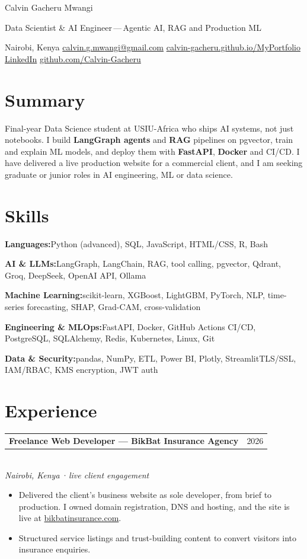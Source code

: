 \documentclass[10pt,a4paper]{article}
\makeatletter
\newcommand{\sep}{\hspace{0.45em}{\color{rule}|}\hspace{0.45em}}
\newcommand{\meta}[1]{{\color{muted}#1}}
\newcommand{\skill}[2]{{\textbf{#1:}\hspace{0.4em}#2\par}\vspace{2pt}}
\newcommand{\entry}[3]{%
  \begin{tabularx}{\linewidth}{@{}X r@{}}
    {\fontsize{10.5}{12.5}\selectfont\bfseries #1} & \meta{#2} \\
  \end{tabularx}\\[-1pt]
  {\color{muted}\itshape #3}\par
}
\makeatother
\begin{document}
{\fontsize{22}{26}\selectfont{}\selectfont Calvin Gacheru Mwangi}\par
\vspace{2pt}
{\fontsize{11.5}{13.5}\selectfont\color{accent} Data Scientist \& AI Engineer\,—\,Agentic AI, RAG and Production ML}\par
\vspace{4pt}
{\small\color{muted}
Nairobi, Kenya\sep
\href{mailto:calvin.g.mwangi@gmail.com}{calvin.g.mwangi@gmail.com}\sep
\href{https://calvin-gacheru.github.io/MyPortfolio/}{calvin-gacheru.github.io/MyPortfolio}\sep
\href{https://ke.linkedin.com/in/calvin-gacheru-057672281}{LinkedIn}\sep
\href{https://github.com/Calvin-Gacheru}{github.com/Calvin-Gacheru}
}\par

\section{Summary}
Final-year Data Science student at USIU-Africa who ships AI systems, not just notebooks. I build \textbf{LangGraph agents} and \textbf{RAG} pipelines on pgvector,
train and explain ML models, and deploy them with \textbf{FastAPI}, \textbf{Docker} and CI/CD. I have delivered a live production website for a commercial client,
and I am seeking graduate or junior roles in AI engineering, ML or data science.

\section{Skills}
\skill{Languages}{Python (advanced), SQL, JavaScript, HTML/CSS, R, Bash}
\skill{AI \& LLMs}{LangGraph, LangChain, RAG, tool calling, pgvector, Qdrant, Groq, DeepSeek, OpenAI API, Ollama}
\skill{Machine Learning}{scikit-learn, XGBoost, LightGBM, PyTorch, NLP, time-series forecasting, SHAP, Grad-CAM, \mbox{cross-validation}}
\skill{Engineering \& MLOps}{FastAPI, Docker, GitHub Actions CI/CD, PostgreSQL, SQLAlchemy, Redis, Kubernetes, Linux, Git}
\skill{Data \& Security}{pandas, NumPy, ETL, Power BI, Plotly, Streamlit\sep TLS/SSL, IAM/RBAC, KMS encryption, JWT auth}

\section{Experience}
\entry{Freelance Web Developer — BikBat Insurance Agency}{2026}{Nairobi, Kenya\,·\,live client engagement}
\begin{itemize}
  \item Delivered the client's business website as sole developer, from brief to production. I owned domain registration, DNS and hosting, and the site is live at \href{https://bikbatinsurance.com}{\color{accent}\mbox{bikbatinsurance.com}}.
  \item Structured service listings and trust-building content to convert visitors into insurance enquiries.
\end{itemize}
\end{document}
